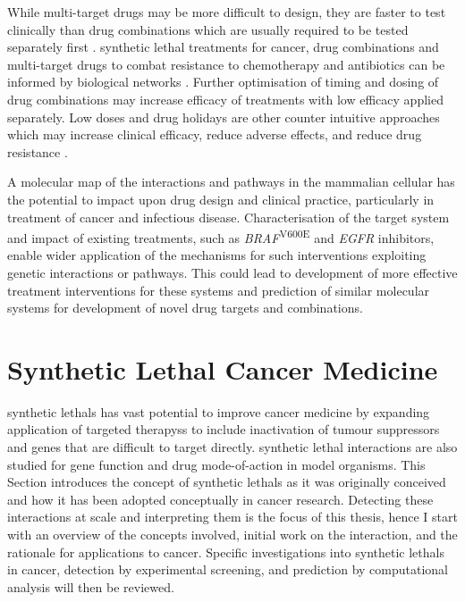 While multi-target drugs may be more difficult to design, they are faster to test clinically than drug combinations which are usually required to be tested separately first \citep{Hopkins2008}. \Gls{synthetic lethal} \glspl{treatment} for cancer, drug combinations and multi-target drugs to combat resistance to \gls{chemotherapy} and antibiotics can be informed by biological networks \citep{Hopkins2008, Barabasi2004}. Further optimisation of timing and dosing of drug combinations may increase efficacy of \glspl{treatment} with low efficacy applied separately. Low doses and drug holidays are other counter intuitive approaches which may increase clinical efficacy, reduce adverse effects, and reduce drug resistance \citep{Sun2014, Tsai2012}.  

A molecular map of the interactions and \glspl{pathway} in the mammalian cellular  has the potential to impact upon drug design and clinical practice, particularly in treatment of cancer and infectious disease. Characterisation of the target system and impact of existing \glspl{treatment}, such as  \textit{BRAF}\textsuperscript{V600E} and \textit{EGFR} inhibitors, enable wider application of the mechanisms for such interventions exploiting genetic interactions or \glspl{pathway}. This could lead to development of more effective treatment interventions for these systems and prediction of similar molecular systems for development of novel drug targets and combinations.  
\fi


\section{Synthetic Lethal Cancer Medicine}

\Glspl{synthetic lethal} has vast potential to improve cancer medicine by expanding application of \glspl{targeted therapy}s to include inactivation of \glspl{tumour suppressor} and genes that are difficult to target directly. \Gls{synthetic lethal} interactions are also studied for gene function and drug mode-of-action in model organisms. This Section introduces the concept of \glspl{synthetic lethal} as it was originally conceived and how it has been adopted conceptually in cancer research. Detecting these interactions at scale and interpreting them is the focus of this thesis, hence I start with an overview of the concepts involved, initial work on the interaction, and the rationale for applications to cancer. Specific investigations into \glspl{synthetic lethal} in cancer, detection by experimental screening, and prediction by computational analysis will then be reviewed.



